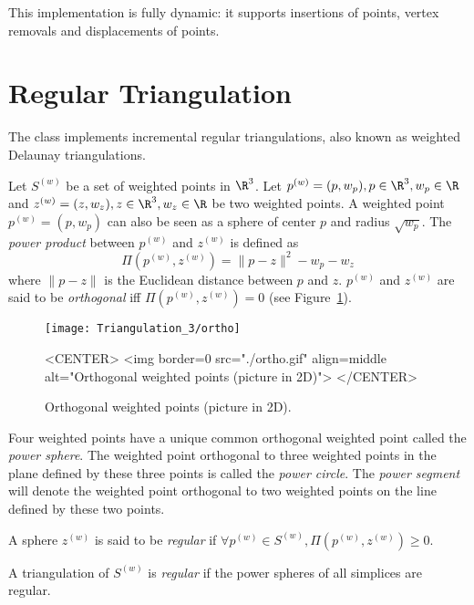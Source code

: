 This implementation is fully dynamic: it supports insertions of points, vertex removals
and displacements of points.


\section{Regular Triangulation\label{Triangulation3-sec-class-Regulartriangulation}}

The class  implements incremental regular
triangulations, also known as weighted Delaunay triangulations.

Let ${S}^{(w)}$ be a set of weighted points in $\R^3$. Let
${p}^{(w)}=(p,w_p), p\in\R^3, w_p\in\R$ and 
${z}^{(w)}=(z,w_z), z\in\R^3, w_z\in\R$ be two weighted points. 
A weighted point
${p}^{(w)}=(p,w_p)$ can also be seen as a sphere of center $p$ and
radius $\sqrt{w_p}$. 
The \textit{power product} between ${p}^{(w)}$ and ${z}^{(w)}$ is
defined as 
\[\Pi({p}^{(w)},{z}^{(w)}) = {\|{p-z}\|^2-w_p-w_z}\]
where $\|{p-z}\|$ is the Euclidean distance between $p$ and $z$. 
 ${p}^{(w)}$ and ${z}^{(w)}$
are said to be \textit{orthogonal} iff $\Pi{({p}^{(w)},{z}^{(w)})}
= 0$ (see Figure~\ref{Triangulation3-fig-ortho}).

\begin{figure}[htbp]
\begin{ccTexOnly}
\begin{center} 
\texttt{[image: Triangulation\_3/ortho]} 
\end{center}
\end{ccTexOnly}
\begin{ccHtmlOnly}
<CENTER>
<img border=0 src="./ortho.gif" align=middle alt="Orthogonal weighted
points (picture in 2D)"> 
</CENTER>
\end{ccHtmlOnly}
\caption{Orthogonal weighted points (picture in 2D).
\label{Triangulation3-fig-ortho}}
\end{figure} 

Four weighted points have a unique common orthogonal weighted point
called the \textit{power sphere}.  The weighted point orthogonal to
three weighted points in the plane defined by these three points is
called the \textit{power circle}. The
\textit{power segment} will denote the weighted point orthogonal to
two weighted points on the line defined by these two points.

A sphere ${z}^{(w)}$ is said to be
\textit{regular} if $\forall {p}^{(w)}\in{S}^{(w)},
\Pi{({p}^{(w)},{z}^{(w)})}\geq 0$.

A triangulation of ${S}^{(w)}$ is \textit{regular} if the power spheres
of all simplices are regular. 

